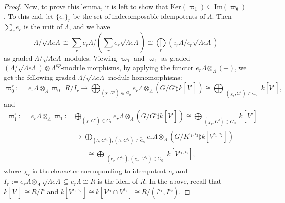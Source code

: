 \documentclass[11pt,reqno]{amsart}
\theoremstyle{definition}
\begin{document}
\begin{proof}
Now, to prove this lemma, it is left to show that
$\mathrm{Ker}(\varpi_1) \subseteq \mathrm{Im}
(\varpi_0)$. 
To this end, let $\{e_r\}_r$ be the set of indecomposable
idempotents of $\Lambda$. Then $\sum_r e_r$ is the unit of $\Lambda$,
and we have
$$\Lambda / \sqrt{\Lambda e \Lambda} 
\cong \sum_r e_r \Lambda 
\Big/ (\sum_r e_r \sqrt{\Lambda e \Lambda})  
\cong \bigoplus\limits_r (e_r 
\Lambda \big/ e_r \sqrt{\Lambda e \Lambda})$$ 
as graded $\Lambda/\sqrt{\Lambda e \Lambda}$-modules. 
Viewing
$\bar{\varpi}_0$ and 
$\bar{\varpi}_1$ as graded 
$(\Lambda/\sqrt{\Lambda e \Lambda}) 
\otimes \Lambda^{op}$-module morphisms, 
by applying the functor 
$e_r \Lambda \otimes_{\Lambda}(-)$, 
we get the following graded 
$\Lambda /\sqrt{\Lambda e \Lambda}$-module
homomorphisms: 
$$
\varpi_0^r : =  e_r \Lambda \otimes_{\Lambda} \varpi_0: 
R / I_r \rightarrow \bigoplus_{(\chi, G^i) \in \tilde{G}_0} e_r 
\Lambda \otimes_{\Lambda} (G/G^i \sharp k[V^i]) \cong 
\bigoplus_{\substack{(\chi_r, G^i) \in \tilde{G}_0 
}} k[V^i],
$$
and 
\begin{align*}
	\varpi_1^r : =  e_r \Lambda \otimes_{\Lambda} \varpi_1: &  
\bigoplus_{(\chi, G^i) \in \tilde{G}_0} e_r \Lambda \otimes_{\Lambda} 
(G/G^i \sharp k[V^i]) \cong \bigoplus_{\substack{(\chi_r, G^i) 
\in \tilde{G}_0 
}} k[V^i]  \\
& \longrightarrow \bigoplus\limits_{(\lambda, G^{i_1}), (\lambda, G^{i_2}) 
\in \tilde{G}_0} e_r \Lambda \otimes_{\Lambda} (G /K^{i_1, i_2} \sharp k[V^{i_1, i_2}]) \\
&\quad\quad \cong \bigoplus\limits_{\substack{(\chi_r, G^{i_1}), (\chi_r, G^{i_2}) \in \tilde{G}_0  
}} k[V^{i_1, i_2}], 
\end{align*}
where $\chi_r$ is the character corresponding to
idempotent $e_r$ and 
$I_r := e_r \Lambda \otimes_{\Lambda} 
\sqrt{\Lambda e \Lambda} \subseteq e_r \Lambda \cong R$ 
is the 
ideal of $R$. In the above,
recall that $k[V^{i}] \cong R/I^i$ and
$k[V^{i_1, i_2}] 
\cong k[V^{i_1} \cap V^{1_2}] 
\cong R/(I^{i_1}, I^{i_2})$. 


\end{proof}
\end{document}
